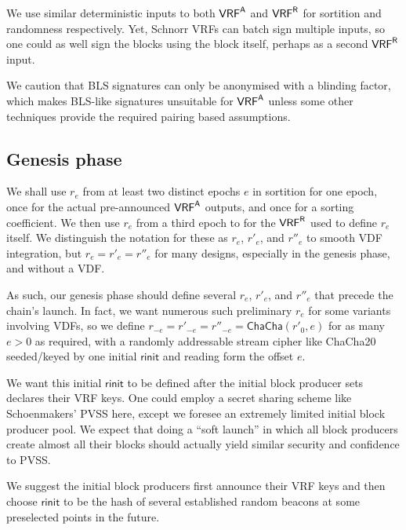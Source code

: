 We use similar deterministic inputs to both $\mathsf{VRF}^{\mathsf{A}}$ and $\mathsf{VRF}^{\mathsf{R}}$ for sortition and randomness respectively.  Yet, Schnorr VRFs \cite{NSEC5,schnorrkel} can batch sign multiple inputs, so one could as well sign the blocks using the block itself, perhaps as a second $\mathsf{VRF}^{\mathsf{R}}$ input. 

We caution that BLS signatures can only be anonymised with a blinding factor, which makes BLS-like signatures unsuitable for $\mathsf{VRF}^{\mathsf{A}}$ unless some other techniques provide the required pairing based assumptions.

\subsection{Genesis phase}\label{subsec:genesis_phase}

We shall use $r_e$ from at least two distinct epochs $e$ in sortition for one epoch, once for the actual pre-announced $\mathsf{VRF}^{\mathsf{A}}$ outputs, and once for a sorting coefficient.  We then use $r_e$ from a third epoch to for the $\mathsf{VRF}^{\mathsf{R}}$ used to define $r_e$ itself.  We distinguish the notation for these as $r_e$, $r'_e$, and $r''_e$ to smooth VDF integration, but $r_e = r'_e = r''_e$ for many designs, especially in the genesis phase, and without a VDF.

As such, our genesis phase should define several $r_e$, $r'_e$, and $r''_e$ that precede the chain's launch.  In fact, we want numerous such preliminary $r_e$ for some variants involving VDFs, so we define $r_{-e} = r'_{-e} = r''_{-e} = \mathsf{ChaCha}(r'_0,e)$ for as many $e > 0$ as required, with a randomly addressable stream cipher like ChaCha20 seeded/keyed by one initial $\mathsf{rinit}$ and reading form the offset $e$.

We want this initial $\mathsf{rinit}$ to be defined after the initial block producer sets declares their VRF keys.  One could employ a secret sharing scheme like Schoenmakers' PVSS \cite{Schoenmakers_PVSS} here, except we foresee an extremely limited initial block producer pool.  We expect that doing a ``soft launch'' in which all block producers create almost all their blocks should actually yield similar security and confidence to PVSS. 

We suggest the initial block producers first announce their VRF keys and then choose $\mathsf{rinit}$ to be the hash of several established random beacons at some preselected points in the future.


